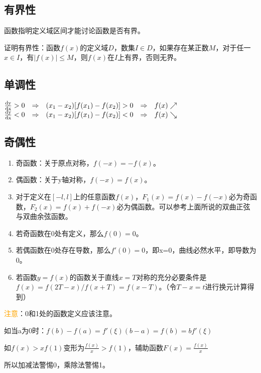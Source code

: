 \documentclass[UTF8, 12pt]{ctexart}
\begin{document}
\subsection{有界性}

函数指明定义域区间才能讨论函数是否有界。

证明有界性：函数$f(x)$的定义域$D$，数集$I\in D$，如果存在某正数$M$，对于任一$x\in I$，有$\vert f(x)\vert\leqslant M$，则$f(x)$在$I$上有界，否则无界。

\subsection{单调性}

$\begin{matrix}
        \frac{\rm{d}y}{\rm{d}x}>0 & \Rightarrow & (x_1-x_2)[f(x_1)-f(x_2)]>0 & \Rightarrow & f(x)\nearrow  \\
        \frac{\rm{d}y}{\rm{d}x}<0 & \Rightarrow & (x_1-x_2)[f(x_1)-f(x_2)]<0 & \Rightarrow &f(x)\searrow
    \end{matrix}
$

\subsection{奇偶性}

\begin{enumerate}
    \item 奇函数：关于原点对称，$f(-x)=-f(x)$。
    \item 偶函数：关于y轴对称，$f(-x)=f(x)$。
    \item 对于定义在$[-l,l]$上的任意函数$f(x)$，$F_1(x)=f(x)-f(-x)$必为奇函数，$F_2(x)=f(x)+f(-x)$必为偶函数。可以参考上面所说的双曲正弦与双曲余弦函数。
    \item 若奇函数在0处有定义，那么$f(0)=0$。
    \item 若偶函数在0处存在导数，那么$f'(0)=0$，即x=0，曲线必然水平，即导数为0。
    \item 若函数$y=f(x)$的函数关于直线$x=T$对称的充分必要条件是$f(x)=f(2T-x)/f(x+T)=f(x-T)$。（令$T-x=t$进行换元计算得到）
\end{enumerate}

\textcolor{orange}{注意}：0和1处的函数定义应该注意。

如当a为0时：$f(b)-f(a)=f'(\xi )(b-a)=f(b)=bf'(\xi)$

如$f(x)>xf(1)$变形为$\frac{f(x)}{x}>f(1)$，辅助函数$F(x)=\frac{f(x)}{x}$

所以加减法警惕0，乘除法警惕1。
\end{document}
